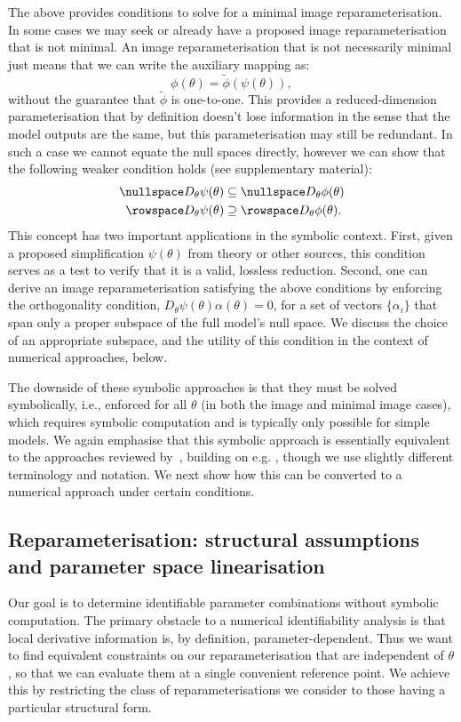 The above provides conditions to solve for a minimal image reparameterisation. In some cases we may seek or already have a proposed image reparameterisation that is not minimal. An image reparameterisation that is not necessarily minimal just means that we can write the auxiliary mapping as:
\begin{equation}
\phi(\theta) = \tilde{\phi}(\psi(\theta)),
\label{eq:suff-reparam}
\end{equation}
without the guarantee that $\tilde{\phi}$ is one-to-one. This provides a reduced-dimension parameterisation that by definition doesn't lose information in the sense that the model outputs are the same, but this parameterisation may still be redundant. In such a case we cannot equate the null spaces directly, however we can show that the following weaker condition holds (see supplementary material):
\begin{equation}
    \begin{aligned}
\nullspace D_\theta\psi(\theta) &\subseteq \nullspace D_\theta\phi(\theta)\\
\rowspace D_\theta\psi(\theta) &\supseteq \rowspace D_\theta\phi(\theta).
\end{aligned}
\end{equation}
This concept has two important applications in the symbolic context. First, given a proposed simplification $\psi(\theta)$ from theory or other sources, this condition serves as a test to verify that it is a valid, lossless reduction. Second, one can derive an image reparameterisation satisfying the above conditions by enforcing the orthogonality condition, $D_\theta\psi(\theta)\alpha(\theta)=0$, for a set of vectors $\{\alpha_i\}$ that span only a proper subspace of the full model's null space. We discuss the choice of an appropriate subspace, and the utility of this condition in the context of numerical approaches, below.

The downside of these symbolic approaches is that they must be solved symbolically, i.e., enforced for all $\theta$ (in both the image and minimal image cases), which requires symbolic computation and is typically only possible for simple models. We again emphasise that this symbolic approach is essentially equivalent to the approaches reviewed by~\cite{Cole2010, Cole2020}, building on e.g. \cite{Catchpole1997,Catchpole1998}, though we use slightly different terminology and notation. We next show how this can be converted to a numerical approach under certain conditions.

\subsection{Reparameterisation: structural assumptions and parameter space linearisation}
Our goal is to determine identifiable parameter combinations without symbolic computation. The primary obstacle to a numerical identifiability analysis is that local derivative information is, by definition, parameter-dependent. Thus we want to find equivalent constraints on our reparameterisation that are independent of $\theta$, so that we can evaluate them at a single convenient reference point. We achieve this by restricting the class of reparameterisations we consider to those having a particular structural form.

